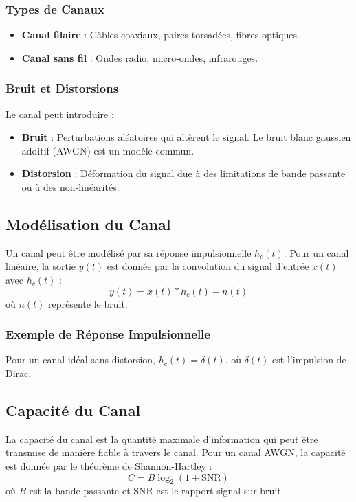 \documentclass[10pt,a4paper]{article}
\begin{document}
\subsubsection*{Types de Canaux}
\begin{itemize}
    \item \textbf{Canal filaire} : Câbles coaxiaux, paires torsadées, fibres optiques.
    \item \textbf{Canal sans fil} : Ondes radio, micro-ondes, infrarouges.
\end{itemize}

\subsubsection*{Bruit et Distorsions}
Le canal peut introduire :
\begin{itemize}
    \item \textbf{Bruit} : Perturbations aléatoires qui altèrent le signal. Le bruit blanc gaussien additif (AWGN) est un modèle commun.
    \item \textbf{Distorsion} : Déformation du signal due à des limitations de bande passante ou à des non-linéarités.
\end{itemize}

\subsection*{Modélisation du Canal}
Un canal peut être modélisé par sa réponse impulsionnelle \( h_c(t) \). Pour un canal linéaire, la sortie \( y(t) \) est donnée par la convolution du signal d'entrée \( x(t) \) avec \( h_c(t) \) :
\[ y(t) = x(t) * h_c(t) + n(t) \]
où \( n(t) \) représente le bruit.

\subsubsection*{Exemple de Réponse Impulsionnelle}
Pour un canal idéal sans distorsion, \( h_c(t) = \delta(t) \), où \( \delta(t) \) est l'impulsion de Dirac.

\subsection*{Capacité du Canal}
La capacité du canal est la quantité maximale d'information qui peut être transmise de manière fiable à travers le canal. Pour un canal AWGN, la capacité est donnée par le théorème de Shannon-Hartley :
\[ C = B \log_2(1 + \text{SNR}) \]
où \( B \) est la bande passante et SNR est le rapport signal sur bruit.
\end{document}
